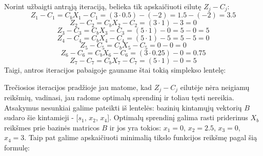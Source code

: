 \documentclass{article}
\begin{document}
Norint užbaigti antrąją iteraciją, belieka tik apskaičiuoti eilutę $Z_j-C_j$:
\begin{equation*}
    Z_1-C_1=C_bX_1-C_1=(3\cdot0.5)-(-2)=1.5-(-2)=3.5
\end{equation*}
\begin{equation*}
    Z_2-C_2=C_bX_2-C_2=(3\cdot1)-3=0
\end{equation*}
\begin{equation*}
    Z_3-C_3=C_bX_3-C_3=(5\cdot1)-0=5-0=5
\end{equation*}
\begin{equation*}
    Z_4-C_4=C_bX_4-C_4=(5\cdot1)-5=5-5=0
\end{equation*}
\begin{equation*}
    Z_5-C_5=C_bX_5-C_5=0-0=0
\end{equation*}
\begin{equation*}
    Z_6-C_6=C_bX_6-C_6=(3\cdot0.25)-0=0.75
\end{equation*}
\begin{equation*}
    Z_7-C_7=C_bX_7-C_7=(5\cdot1)-0=5
\end{equation*}
Taigi, antros iteracijos pabaigoje gauname štai tokią simplekso lentelę:
\begin{table}[H]
    \centering
    \caption{Simplekso lentelė pirmos iteracijos pabaigoje}
    \label{table:3}
\end{table}
Trečiosios iteracijos pradžioje jau matome, kad $Z_j-C_j$ eilutėje nėra neigiamų reikšmių, vadinasi, jau radome optimalų sprendinį ir toliau tęsti nereikia. Atsakymus nesunkiai galime pateikti iš lentelės: bazinių kintamųjų vektorių $B$ sudaro šie kintamieji - [$s_1$, $x_2$, $x_4$]. Optimalų sprendinį galima rasti priderinus $X_b$ reikšmes prie bazinės matricos $B$ ir jos yra tokios: $x_1=0$, $x_2=2.5$, $x_3=0$, $x_4=3$. Taip pat galime apskaičiuoti minimalią tikslo funkcijos reikšmę pagal šią formulę:
\end{document}
